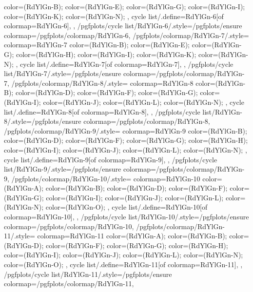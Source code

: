 {{{      color=(RdYlGn-B);
      color=(RdYlGn-E);
      color=(RdYlGn-G);
      color=(RdYlGn-I);
      color=(RdYlGn-K);
      color=(RdYlGn-N);
    },
    cycle list/.define={RdYlGn-6}{[of colormap=RdYlGn-6]},
  },
  /pgfplots/cycle list/RdYlGn-6/.style={/pgfplots/ensure colormap={/pgfplots/colormap/RdYlGn-6}},
  /pgfplots/colormap/RdYlGn-7/.style={
    colormap={RdYlGn-7}{
      color=(RdYlGn-B);
      color=(RdYlGn-E);
      color=(RdYlGn-G);
      color=(RdYlGn-H);
      color=(RdYlGn-I);
      color=(RdYlGn-K);
      color=(RdYlGn-N);
    },
    cycle list/.define={RdYlGn-7}{[of colormap=RdYlGn-7]},
  },
  /pgfplots/cycle list/RdYlGn-7/.style={/pgfplots/ensure colormap={/pgfplots/colormap/RdYlGn-7}},
  /pgfplots/colormap/RdYlGn-8/.style={
    colormap={RdYlGn-8}{
      color=(RdYlGn-B);
      color=(RdYlGn-D);
      color=(RdYlGn-F);
      color=(RdYlGn-G);
      color=(RdYlGn-I);
      color=(RdYlGn-J);
      color=(RdYlGn-L);
      color=(RdYlGn-N);
    },
    cycle list/.define={RdYlGn-8}{[of colormap=RdYlGn-8]},
  },
  /pgfplots/cycle list/RdYlGn-8/.style={/pgfplots/ensure colormap={/pgfplots/colormap/RdYlGn-8}},
  /pgfplots/colormap/RdYlGn-9/.style={
    colormap={RdYlGn-9}{
      color=(RdYlGn-B);
      color=(RdYlGn-D);
      color=(RdYlGn-F);
      color=(RdYlGn-G);
      color=(RdYlGn-H);
      color=(RdYlGn-I);
      color=(RdYlGn-J);
      color=(RdYlGn-L);
      color=(RdYlGn-N);
    },
    cycle list/.define={RdYlGn-9}{[of colormap=RdYlGn-9]},
  },
  /pgfplots/cycle list/RdYlGn-9/.style={/pgfplots/ensure colormap={/pgfplots/colormap/RdYlGn-9}},
  /pgfplots/colormap/RdYlGn-10/.style={
    colormap={RdYlGn-10}{
      color=(RdYlGn-A);
      color=(RdYlGn-B);
      color=(RdYlGn-D);
      color=(RdYlGn-F);
      color=(RdYlGn-G);
      color=(RdYlGn-I);
      color=(RdYlGn-J);
      color=(RdYlGn-L);
      color=(RdYlGn-N);
      color=(RdYlGn-O);
    },
    cycle list/.define={RdYlGn-10}{[of colormap=RdYlGn-10]},
  },
  /pgfplots/cycle list/RdYlGn-10/.style={/pgfplots/ensure colormap={/pgfplots/colormap/RdYlGn-10}},
  /pgfplots/colormap/RdYlGn-11/.style={
    colormap={RdYlGn-11}{
      color=(RdYlGn-A);
      color=(RdYlGn-B);
      color=(RdYlGn-D);
      color=(RdYlGn-F);
      color=(RdYlGn-G);
      color=(RdYlGn-H);
      color=(RdYlGn-I);
      color=(RdYlGn-J);
      color=(RdYlGn-L);
      color=(RdYlGn-N);
      color=(RdYlGn-O);
    },
    cycle list/.define={RdYlGn-11}{[of colormap=RdYlGn-11]},
  },
  /pgfplots/cycle list/RdYlGn-11/.style={/pgfplots/ensure colormap={/pgfplots/colormap/RdYlGn-11}},
}
